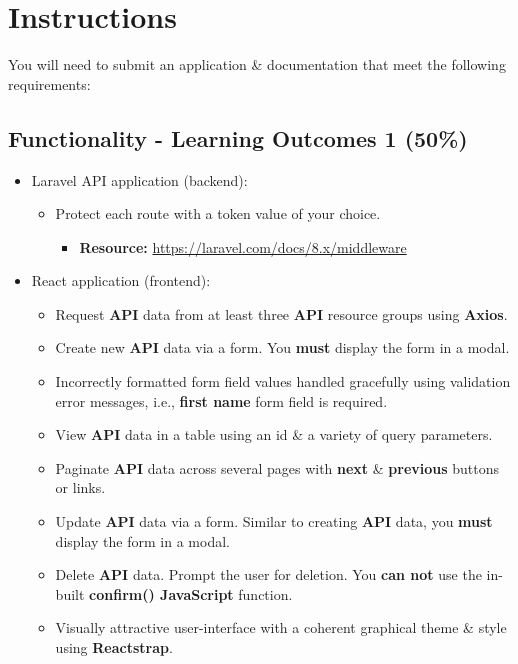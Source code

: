 \documentclass{article}
\begin{document}
\newpage

\section*{Instructions}
You will need to submit an application \& documentation that meet the following requirements:

\subsection*{Functionality - Learning Outcomes 1 (50\%)}

\begin{itemize}
	\item Laravel API application (backend):
	\begin{itemize}
		\item Protect each route with a token value of your choice.
		\begin{itemize}
			\item \textbf{Resource:} \footnotesize\href{https://laravel.com/docs/8.x/middleware}{https://laravel.com/docs/8.x/middleware}
		\end{itemize}
	\end{itemize}
	\item React application (frontend):
	\begin{itemize}
		\item Request \textbf{API} data from at least three \textbf{API} resource groups using \textbf{Axios}.
		\item Create new \textbf{API} data via a form. You \textbf{must} display the form in a modal.
		\item Incorrectly formatted form field values handled gracefully using validation error messages, i.e., \textbf{first name} form field is required.
		\item View \textbf{API} data in a table using an id \& a variety of query parameters. 
		\item Paginate \textbf{API} data across several pages with \textbf{next} \& \textbf{previous} buttons or links.
		\item Update \textbf{API} data via a form. Similar to creating \textbf{API} data, you \textbf{must} display the form in a modal. 
		\item Delete \textbf{API} data. Prompt the user for deletion. You \textbf{can not} use the in-built \textbf{confirm() JavaScript} function.
		\item Visually attractive user-interface with a coherent graphical theme \& style using \textbf{Reactstrap}.

\end{itemize}
\end{itemize}
\end{document}
